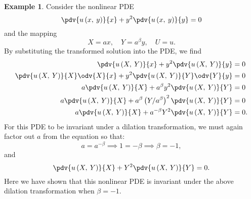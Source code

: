 \documentclass{article}
\theoremstyle{definition}
\newtheorem{example}{Example}[section]
\begin{document}
\begin{example}
    Consider the nonlinear PDE
    \begin{equation*}
        \pdv{u\left( x,\: y \right)}{x} + y^2 \pdv{u\left( x,\: y \right)}{y} = 0
    \end{equation*}
    and the mapping
    \begin{equation*}
        X = a x, \quad Y = a^\beta y, \quad U = u.
    \end{equation*}
    By substituting the transformed solution into the PDE, we find
    \begin{align*}
        \pdv{u\left( X,\: Y \right)}{x} + y^2 \pdv{u\left( X,\: Y \right)}{y}                                    & = 0  \\
        \pdv{u\left( X,\: Y \right)}{X} \odv{X}{x} + y^2 \pdv{u\left( X,\: Y \right)}{Y} \odv{Y}{y}              & = 0  \\
        a \pdv{u\left( X,\: Y \right)}{X} + a^\beta y^2 \pdv{u\left( X,\: Y \right)}{Y}                          & = 0  \\
        a \pdv{u\left( X,\: Y \right)}{X} + a^\beta \left( Y / a^\beta \right)^2 \pdv{u\left( X,\: Y \right)}{Y} & = 0  \\
        a \pdv{u\left( X,\: Y \right)}{X} + a^{-\beta} Y^2 \pdv{u\left( X,\: Y \right)}{Y}                       & = 0.
    \end{align*}
    For this PDE to be invariant under a dilation transformation, we
    must again factor out \(a\) from the equation so that:
    \begin{equation*}
        a = a^{-\beta} \implies 1 = -\beta \implies \beta = -1,
    \end{equation*}
    and
    \begin{equation*}
        \pdv{u\left( X,\: Y \right)}{X} + Y^2 \pdv{u\left( X,\: Y \right)}{Y} = 0.
    \end{equation*}
    Here we have shown that this nonlinear PDE is invariant under the
    above dilation transformation when \(\beta = -1\).
\end{example}
\end{document}
